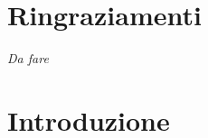 \chapter*{Ringraziamenti} %
\begin{flushright}
\itshape 
Da fare
\end{flushright}


\chapter{Introduzione}